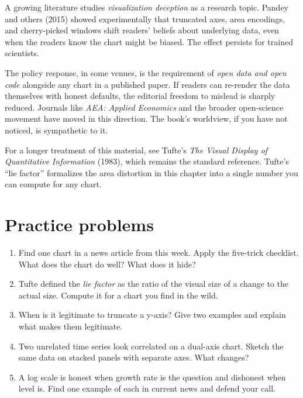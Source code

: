 \documentclass[
  letterpaper,
  11pt,
  twoside,
  openany]{scrbook}
\begin{document}
\begin{tcolorbox}[enhanced jigsaw, arc=.35mm, bottomrule=.15mm, bottomtitle=1mm, breakable, colback=white, colbacktitle=quarto-callout-important-color!10!white, colframe=quarto-callout-important-color-frame, coltitle=black, left=2mm, leftrule=.75mm, opacityback=0, opacitybacktitle=0.6, rightrule=.15mm, title=\textcolor{quarto-callout-important-color}{\faExclamation}\hspace{0.5em}{Frontier note}, titlerule=0mm, toprule=.15mm, toptitle=1mm]

A growing literature studies \emph{visualization deception} as a
research topic. Pandey and others (2015) showed experimentally that
truncated axes, area encodings, and cherry-picked windows shift readers'
beliefs about underlying data, even when the readers know the chart
might be biased. The effect persists for trained scientists.

The policy response, in some venues, is the requirement of \emph{open
data and open code} alongside any chart in a published paper. If readers
can re-render the data themselves with honest defaults, the editorial
freedom to mislead is sharply reduced. Journals like \emph{AEA: Applied
Economics} and the broader open-science movement have moved in this
direction. The book's worldview, if you have not noticed, is sympathetic
to it.

For a longer treatment of this material, see Tufte's \emph{The Visual
Display of Quantitative Information} (1983), which remains the standard
reference. Tufte's ``lie factor'' formalizes the area distortion in this
chapter into a single number you can compute for any chart.

\end{tcolorbox}

\section{Practice problems}\label{practice-problems-5}

\begin{enumerate}
\def\labelenumi{\arabic{enumi}.}
\item
  Find one chart in a news article from this week. Apply the five-trick
  checklist. What does the chart do well? What does it hide?
\item
  Tufte defined the \emph{lie factor} as the ratio of the visual size of
  a change to the actual size. Compute it for a chart you find in the
  wild.
\item
  When is it legitimate to truncate a y-axis? Give two examples and
  explain what makes them legitimate.
\item
  Two unrelated time series look correlated on a dual-axis chart. Sketch
  the same data on stacked panels with separate axes. What changes?
\item
  A log scale is honest when growth rate is the question and dishonest
  when level is. Find one example of each in current news and defend
  your call.
\end{enumerate}
\end{document}

